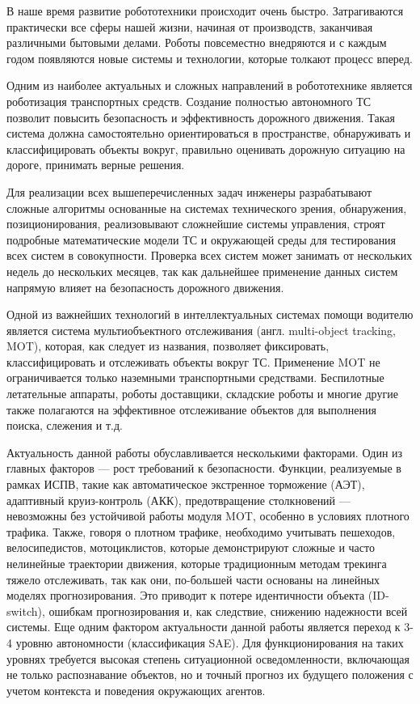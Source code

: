 
В наше время развитие робототехники происходит очень быстро. Затрагиваются практически все сферы нашей жизни, начиная от производств, заканчивая различными бытовыми делами. Роботы повсеместно внедряются и с каждым годом появляются новые системы и технологии, которые толкают процесс вперед.
 
Одним из наиболее актуальных и сложных направлений в робототехнике является роботизация транспортных средств. Создание полностью автономного ТС позволит повысить безопасность и эффективность дорожного движения. Такая система должна самостоятельно ориентироваться в пространстве, обнаруживать и классифицировать объекты вокруг, правильно оценивать дорожную ситуацию на дороге, принимать верные решения.

Для реализации всех вышеперечисленных задач инженеры разрабатывают сложные алгоритмы основанные на системах технического зрения, обнаружения, позиционирования, реализовывают сложнейшие системы управления, строят подробные математические модели ТС и окружающей среды для тестирования всех систем в совокупности. Проверка всех систем может занимать от нескольких недель до нескольких месяцев, так как дальнейшее применение данных систем напрямую влияет на безопасность дорожного движения.

Одной из важнейших технологий в интеллектуальных системах помощи водителю является система мультиобъектного отслеживания (англ. multi-object tracking, MOT), которая, как следует из названия, позволяет фиксировать, классифицировать и отслеживать объекты вокруг ТС. Применение MOT не ограничивается только наземными транспортными средствами. Беспилотные летательные аппараты, роботы доставщики, складские роботы и многие другие также полагаются на эффективное отслеживание объектов для выполнения поиска, слежения и т.д. 

Актуальность данной работы обуславливается несколькими факторами. Один из главных факторов --- рост требований к безопасности. Функции, реализуемые в рамках ИСПВ, такие как автоматическое экстренное торможение (АЭТ), адаптивный круиз-контроль (АКК), предотвращение столкновений — невозможны без устойчивой работы модуля MOT, особенно в условиях плотного трафика. Также, говоря о плотном трафике, необходимо учитывать пешеходов, велосипедистов, мотоциклистов, которые демонстрируют сложные и часто нелинейные траектории движения, которые традиционным методам трекинга тяжело отслеживать, так как они, по-большей части основаны на линейных моделях прогнозирования. Это приводит к потере идентичности объекта (ID-switch), ошибкам прогнозирования и, как следствие, снижению надежности всей системы.
Еще одним фактором актуальности данной работы является переход к 3-4 уровню автономности (классификация SAE). Для функционирования на таких уровнях требуется высокая степень ситуационной осведомленности, включающая не только распознавание объектов, но и точный прогноз их будущего положения с учетом контекста и поведения окружающих агентов.


